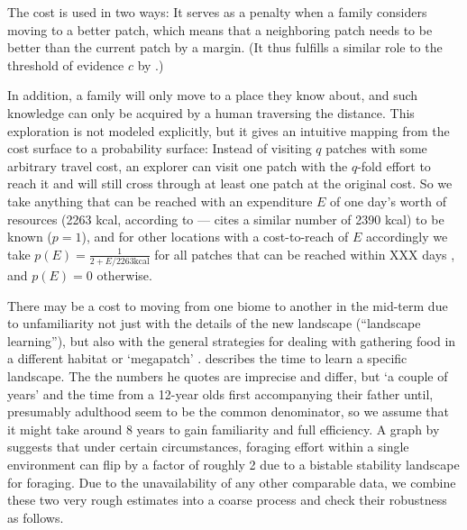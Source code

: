 \documentclass[a4paper,12pt]{scrartcl}
\begin{document}
The cost is used in two ways: It serves as a penalty when a family considers
moving to a better patch, which means that a neighboring patch needs to be
better than the current patch by a margin. (It thus fulfills a similar role to
the threshold of evidence $c$ by \textcite{crema2014simulation}.)

In addition, a family will only move to a place they know about, and such
knowledge can only be acquired by a human traversing the distance. This
exploration is not modeled explicitly, but it gives an intuitive mapping from
the cost surface to a probability surface: Instead of visiting $q$ patches with
some arbitrary travel cost, an explorer can visit one patch with the $q$-fold
effort to reach it and will still cross through at least one patch at the
original cost. So we take anything that can be reached with an expenditure $E$
of one day's worth of resources (2263 kcal, according to
\textcite{pontzer2012huntergatherer}---\textcite{smith2003assessment} cites a
similar number of 2390 kcal) to be known ($p=1$), and for other locations with a
cost-to-reach of $E$ accordingly we take $p(E) = \frac{1}{2 + E / {2263 \text{
      kcal}}}$ for all patches that can be reached within XXX days \parencite{},
and $p(E) = 0$ otherwise.

There may be a cost to moving from one biome to another in the mid-term due to
unfamiliarity not just with the details of the new landscape (“landscape
learning”), but also with the general strategies for dealing with gathering food
in a different habitat or ‘megapatch’ \parencite{kelly2003colonization}.
\Textcite{kelly2003colonization} describes the time to learn a specific
landscape. The the numbers he quotes are imprecise and differ, but ‘a couple of
years’ and the time from a 12-year olds first accompanying their father until,
presumably adulthood seem to be the common denominator, so we assume that it
might take around 8 years to gain familiarity and full efficiency. A graph by
\Textcite[Fig. 4]{freeman2017theory} suggests that under certain circumstances,
foraging effort within a single environment can flip by a factor of roughly 2
due to a bistable stability landscape for foraging. Due to the unavailability of
any other comparable data, we combine these two very rough estimates into a
coarse process and check their robustness as follows.
\end{document}

